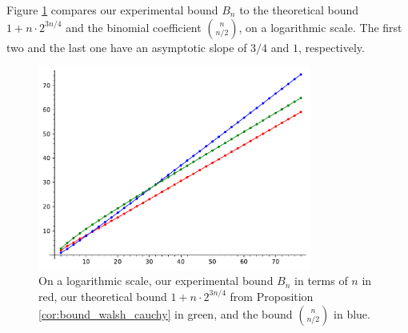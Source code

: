 \documentclass[11pt]{llncs}
\begin{document}
Figure \ref{fig:walsh_bound_comparison} compares our experimental bound $B_n$ to the theoretical bound $1+n\cdot 2^{3n/4}$ and the binomial coefficient $\binom{n}{n/2}$, on a logarithmic scale. The first two and the last one have an asymptotic slope of $3/4$ and $1$, respectively.

\begin{figure}
	\centering
	\includegraphics[width=9cm]{comparison_walsh_bound.pdf}
	\caption{On a logarithmic scale, our experimental bound $B_n$ in terms of $n$ in red, our theoretical bound $1+n\cdot 2^{3n/4}$ from Proposition \ref{cor:bound_walsh_cauchy} in green, and the bound $\binom{n}{n/2}$ in blue.}
	\label{fig:walsh_bound_comparison}
\end{figure}
\end{document}
